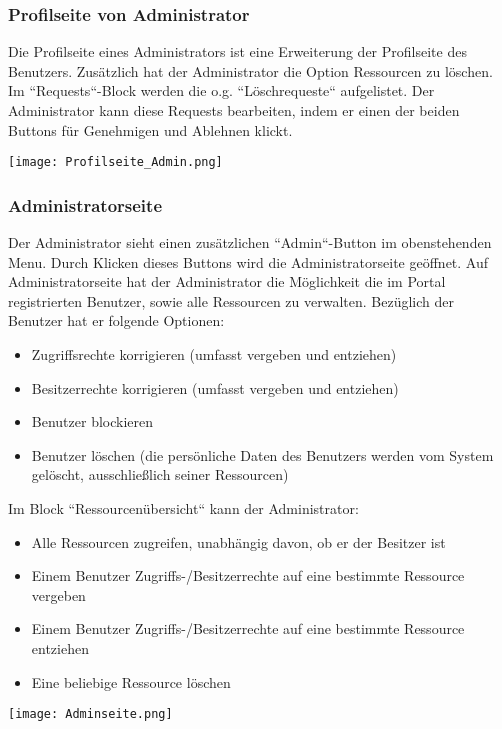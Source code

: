 \documentclass[parskip=full,11pt]{scrartcl}
\begin{document}
\subsubsection*{Profilseite von Administrator}
Die Profilseite eines Administrators ist eine Erweiterung der Profilseite des Benutzers. Zusätzlich hat der Administrator die Option Ressourcen zu löschen. Im ``Requests``-Block werden die o.g. ``Löschrequeste`` aufgelistet. Der Administrator kann diese Requests bearbeiten, indem er einen der beiden Buttons für Genehmigen und Ablehnen klickt.
	\begin{center}
	\texttt{[image: Profilseite\_Admin.png]}
	\end{center}
\newpage	
\subsubsection*{Administratorseite}
Der Administrator sieht einen zusätzlichen ``Admin``-Button im obenstehenden Menu. Durch Klicken dieses Buttons wird die Administratorseite geöffnet. Auf Administratorseite hat der Administrator die Möglichkeit die im Portal registrierten Benutzer, sowie alle Ressourcen zu verwalten. Bezüglich der Benutzer hat er folgende Optionen:
\begin{itemize}
	\item Zugriffsrechte korrigieren (umfasst vergeben und entziehen)
	\item Besitzerrechte korrigieren (umfasst vergeben und entziehen)
	\item Benutzer blockieren
	\item Benutzer löschen (die persönliche Daten des Benutzers werden vom System gelöscht, ausschließlich seiner Ressourcen)
\end{itemize}  
 Im Block ``Ressourcenübersicht`` kann der Administrator:
 \begin{itemize}
 	\item Alle Ressourcen zugreifen, unabhängig davon, ob er der Besitzer ist
 	\item Einem Benutzer Zugriffs-/Besitzerrechte auf eine bestimmte Ressource vergeben
 	\item Einem Benutzer Zugriffs-/Besitzerrechte auf eine bestimmte Ressource entziehen
 	\item Eine beliebige Ressource löschen
 \end{itemize}
	\begin{center}
	\texttt{[image: Adminseite.png]}
	\end{center}
	
\end{document}

